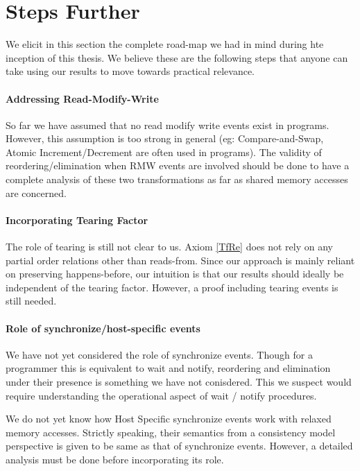\section{Steps Further}

    We elicit in this section the complete road-map we had in mind during hte inception of this thesis. 
    We believe these are the following steps that anyone can take using our results to move towards practical relevance.

    \paragraph{Addressing Read-Modify-Write}
        So far we have assumed that no read modify write events exist in programs.
        However, this assumption is too strong in general (eg: Compare-and-Swap, Atomic Increment/Decrement are often used in programs).
        The validity of reordering/elimination when RMW events are involved should be done to have a complete analysis of these two transformations as far as shared memory accesses are concerned.

    \paragraph{Incorporating Tearing Factor}
        The role of tearing is still not clear to us.
        Axiom \ref{TfRe} does not rely on any partial order relations other than reads-from. 
        Since our approach is mainly reliant on preserving happens-before, our intuition is that our results should ideally be independent of the tearing factor.
        However, a proof including tearing events is still needed.   
  
    \paragraph{Role of synchronize/host-specific events}
        We have not yet considered the role of synchronize events. 
        Though for a programmer this is equivalent to wait and notify, reordering and elimination under their presence is something we have not conisdered. 
        This we suspect would require understanding the operational aspect of wait / notify procedures.

        We do not yet know how Host Specific synchronize events work with relaxed memory accesses.
        Strictly speaking, their semantics from a consistency model perspective is given to be same as that of synchronize events. 
        However, a detailed analysis must be done before incorporating its role. 
    
